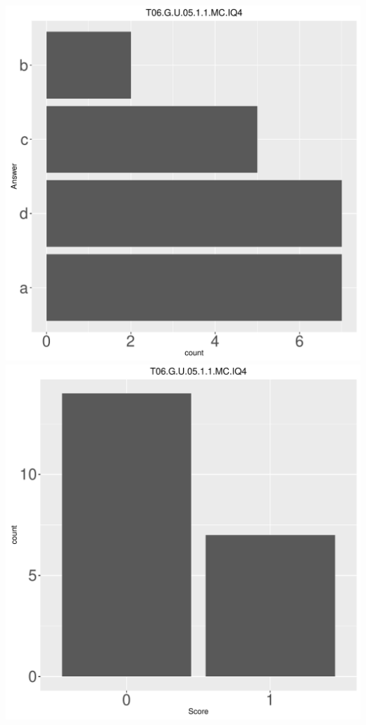 \documentclass[12pt,english,nohyper]{tufte-handout}\usepackage[]{graphicx}\usepackage[]{color}
\begin{document}
\begin{center} \includegraphics[width=.45\linewidth]{Topic06_AB_87_answer} \includegraphics[width=.45\linewidth]{Topic06_AB_87_score} \end{center} 
\end{document}
